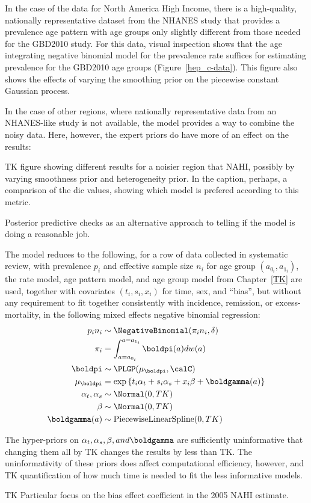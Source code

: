 In the case of the data for North America High Income, there is a
high-quality, nationally representative dataset from the NHANES study
that provides a prevalence age pattern with age groups only slightly
different from those needed for the GBD2010 study.  For this data,
visual inspection shows that the age integrating negative binomial
model for the prevalence rate suffices for estimating prevalence for
the GBD2010 age groups (Figure~\ref{hep_c-data}).  
This figure also shows the effects of varying the smoothing prior on
the piecewise constant Gaussian process.

In the case of other regions, where nationally representative data
from an NHANES-like study is not available, the model provides a way
to combine the noisy data.  Here, however, the expert priors do have
more of an effect on the results:

TK figure showing different results for a noisier region that NAHI,
possibly by varying smoothness prior and heterogeneity prior.  In the
caption, perhaps, a comparison of the dic values, showing which model
is prefered according to this metric.

Posterior predictive checks as an alternative approach to telling if
the model is doing a reasonable job.

The model reduces to the following, for a row of data collected in
systematic review, with prevalence $p_i$ and effective sample size $n_i$ for
age group $(a_{0_i}, a_{1_i})$, the rate model, age pattern model,
and age group model from Chapter~\ref{TK} are used, together with
covariates $(t_i,s_i,x_i)$ for time, sex, and ``bias'', but without any requirement to
fit together consistently with incidence, remission, or
excess-mortality, in the following mixed effects negative binomial
regression:
\begin{align*}
p_i n_i &\sim \NegativeBinomial(\pi_i n_i, \delta)\\
\pi_i &= \int _{a=a_{0_i}} ^{a=a_{1_i}} \boldpi(a) dw(a)\\
\boldpi &\sim \PLGP(\mu_\boldpi, \calC)\\
\mu_\boldpi &= \exp\left\{ t_i \alpha_t + s_i \alpha_s + x_i \beta + \boldgamma(a) \right\}\\
\alpha_t, \alpha_s &\sim \Normal(0, TK)\\
\beta &\sim \Normal(0, TK)\\
\boldgamma(a) &\sim \text{PiecewiseLinearSpline}(0, TK)
\end{align*}

The hyper-priors on $\alpha_t, \alpha_s, \beta, and \boldgamma$ are
sufficiently uninformative that changing them all by TK changes the
results by less than TK.  The uninformativity of these priors does
affect computational efficiency, however, and TK quantification of how
much time is needed to fit the less informative models.

TK Particular focus on the bias effect coefficient in the 2005 NAHI estimate.
